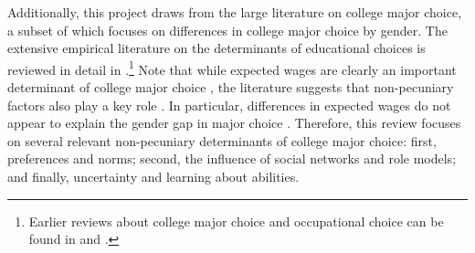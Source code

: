 

Additionally, this project draws from the large literature on college major choice, a subset of which focuses on differences in college major choice by gender.
The extensive empirical literature on the determinants of educational choices is reviewed in detail in \textcite{PWZ20}.\footnote{
    Earlier reviews about college major choice and occupational choice can be found in \textcite{ABM12} and \textcite{AAM16-education}.
}
Note that while expected wages are clearly an important determinant of college major choice \parencite{AHK12}, the literature suggests that non-pecuniary factors also play a key role \parencite{AHMR20,WZ15}.
In particular, differences in expected wages do not appear to explain the gender gap in major choice \parencite{Z13,WZ18}.
Therefore, this review focuses on several relevant non-pecuniary determinants of college major choice: first, preferences and norms; second, the influence of social networks and role models; and finally, uncertainty and learning about abilities.

